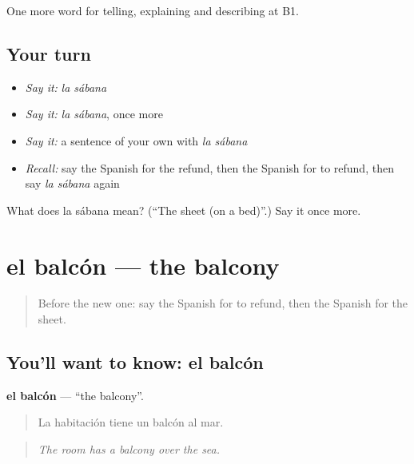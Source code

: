 \begin{grammarlens}[title={What you've built}]
One more word for telling, explaining and describing at B1.
\end{grammarlens}

\subsection*{Your turn}
\begin{itemize}
\raggedright
  \item \emph{Say it:} \emph{la sábana}
  \item \emph{Say it:} \emph{la sábana}, once more
  \item \emph{Say it:} a sentence of your own with \emph{la sábana}
  \item \emph{Recall:} say the Spanish for the refund, then the Spanish for to refund, then say \emph{la sábana} again
\end{itemize}

\begin{tcolorbox}[breakable,colback=teal!4,colframe=teal!35!black,title={Before you move on}]
What does la sábana mean? (\textquotedblleft{}The sheet (on a bed)\textquotedblright{}.) Say it once more.
\end{tcolorbox}
\section[el balcón]{el balcón — the balcony}

\label{lesson:ES-C664-balcon}



\begin{quote}
Before the new one: say the Spanish for to refund, then the Spanish for the sheet.
\end{quote}

\subsection*{You'll want to know: el balcón}
\textbf{el balcón} — \textquotedblleft{}the balcony\textquotedblright{}.

\begin{quote}
La habitación tiene un balcón al mar.
\end{quote}

\begin{quote}
\emph{The room has a balcony over the sea.}
\end{quote}

